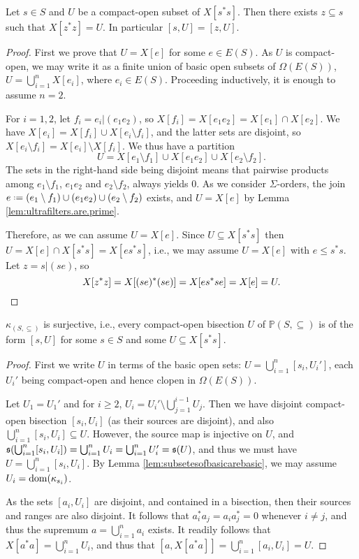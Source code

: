 \begin{lemma}\label{lem:subsetesofbasicarebasic}
Let $s\in S$ and $U$ be a compact-open subset of $X[s^*s]$. Then there exists $z\subseteq s$ such that $X[z^*z]=U$. In particular $[s,U]=[z,U]$.
\end{lemma}
\begin{proof}
    First we prove that $U=X[e]$ for some $e\in E(S)$. As $U$ is compact-open, we may write it as a finite union of basic open subsets of $\Omega(E(S))$, $U=\bigcup_{i=1}^n X[e_i]$, where $e_i\in E(S)$. Proceeding inductively, it is enough to assume $n=2$.
    
    For $i=1,2$, let $f_i=e_i|(e_1e_2)$, so $X[f_i]=X[e_1e_2]=X[e_1]\cap X[e_2]$. We have $X[e_i]=X[f_i]\cup X[e_i\setminus f_i]$, and the latter sets are disjoint, so $X[e_i\setminus f_i]=X[e_i]\setminus X[f_i]$. We thus have a partition
    \[U=X[e_1\setminus f_1]\cup X[e_1e_2]\cup X[e_2\setminus f_2].\]
    The sets in the right-hand side being disjoint means that pairwise products among $e_1\setminus f_1$, $e_1e_2$ and $e_2\setminus f_2$, always yields $0$. As we consider $\Sigma$-orders, the join $e\defeq(e_1\setminus f_1)\cup (e_1e_2)\cup (e_2\setminus f_2)$ exists, and $U=X[e]$ by Lemma \ref{lem:ultrafilters.are.prime}.
    
    Therefore, as we can assume $U=X[e]$. Since $U\subseteq X[s^*s]$ then $U=X[e]\cap X[s^*s]=X[es^*s]$, i.e., we may assume $U=X[e]$ with $e\leq s^*s$. Let $z=s|(se)$, so \[X[z^*z]=X[(se)^*(se)]=X[es^*se]=X[e]=U.\qedhere\]
\end{proof}

\begin{proposition}
    $\kappa_{(S,\subseteq)}$ is surjective, i.e., every compact-open bisection $U$ of $\mathbb{P}(S,\subseteq)$ is of the form $[s,U]$ for some $s\in S$ and some $U\subseteq X[s^*s]$.
\end{proposition}
\begin{proof}
    First we write $U$ in terms of the basic open sets: $U=\bigcup_{i=1}^n[s_i,U_i']$, each $U_i'$ being compact-open and hence clopen in $\Omega(E(S))$.
    
    Let $U_1=U_1'$ and for $i\geq 2$, $U_i=U_i'\setminus\bigcup_{j=1}^{i-1}U_j$. Then we have disjoint compact-open bisection $[s_i,U_i]$ (as their sources are disjoint), and also $\bigcup_{i=1}^n[s_i,U_i]\subseteq U$. However, the source map is injective on $U$, and $\operatorname{\mathfrak{s}}(\bigcup_{i=1}^n[s_i,U_i])=\bigcup_{i=1}^n U_i=\bigcup_{i=1}^n U_i'=\operatorname{\mathfrak{s}}(U)$, and thus we must have $U=\bigcup_{i=1}^n[s_i,U_i]$. By Lemma \ref{lem:subsetesofbasicarebasic}, we may assume $U_i=\operatorname{dom}(\kappa_{s_i})$.
    
    As the sets $[a_i,U_i]$ are disjoint, and contained in a bisection, then their sources and ranges are also disjoint. It follows that $a_i^*a_j=a_ia_j^*=0$ whenever $i\neq j$, and thus the supremum $a=\bigcup_{i=1}^n a_i$ exists. It readily follows that $X[a^*a]=\bigcup_{i=1}^n U_i$, and thus that $[a,X[a^*a]]=\bigcup_{i=1}^n[a_i,U_i]=U$.\qedhere
\end{proof}


